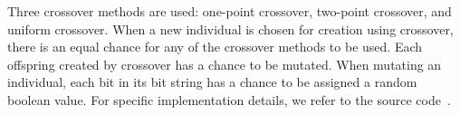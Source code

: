 Three crossover methods are used: one-point crossover, two-point crossover, and uniform crossover. When a new individual is chosen for creation using crossover, there is an equal chance for any of the crossover methods to be used. Each offspring created by crossover has a  chance to be mutated. When mutating an individual, each bit in its bit string has a  chance to be assigned a random boolean value. For specific implementation details, we refer to the source code~\cite{mbm:kmc:ekoGA}.




